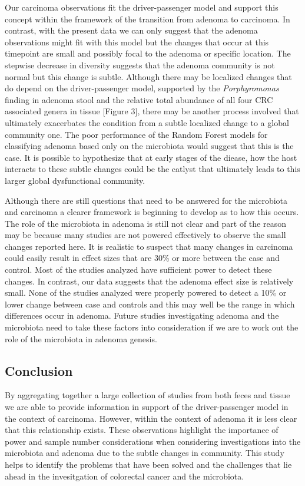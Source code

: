 \documentclass[12pt,]{article}
\begin{document}
Our carcinoma observations fit the driver-passenger model and support
this concept within the framework of the transition from adenoma to
carcinoma. In contrast, with the present data we can only suggest that
the adenoma observations might fit with this model but the changes that
occur at this timepoint are small and possibly focal to the adenoma or
specific location. The stepwise decrease in diversity suggests that the
adenoma community is not normal but this change is subtle. Although
there may be localized changes that do depend on the driver-passenger
model, supported by the \emph{Porphyromonas} finding in adenoma stool
and the relative total abundance of all four CRC associated genera in
tissue {[}Figure 3{]}, there may be another process involved that
ultimately exacerbates the condition from a subtle localized change to a
global community one. The poor performance of the Random Forest models
for classifying adenoma based only on the microbiota would suggest that
this is the case. It is possible to hypothesize that at early stages of
the diease, how the host interacts to these subtle changes could be the
catlyst that ultimately leads to this larger global dysfunctional
community.

Although there are still questions that need to be answered for the
microbiota and carcinoma a clearer framework is beginning to develop as
to how this occurs. The role of the microbiota in adenoma is still not
clear and part of the reason may be because many studies are not powered
effectively to observe the small changes reported here. It is realistic
to suspect that many changes in carcinoma could easily result in effect
sizes that are 30\% or more between the case and control. Most of the
studies analyzed have sufficient power to detect these changes. In
contrast, our data suggests that the adenoma effect size is relatively
small. None of the studies analyzed were properly powered to detect a
10\% or lower change between case and controls and this may well be the
range in which differences occur in adenoma. Future studies
investigating adenoma and the microbiota need to take these factors into
consideration if we are to work out the role of the microbiota in
adenoma genesis.

\subsection{Conclusion}\label{conclusion}

By aggregating together a large collection of studies from both feces
and tissue we are able to provide information in support of the
driver-passenger model in the context of carcinoma. However, within the
context of adenoma it is less clear that this relationship exists. These
observations highlight the importance of power and sample number
considerations when considering investigations into the microbiota and
adenoma due to the subtle changes in community. This study helps to
identify the problems that have been solved and the challenges that lie
ahead in the invesitgation of colorectal cancer and the microbiota.
\end{document}
